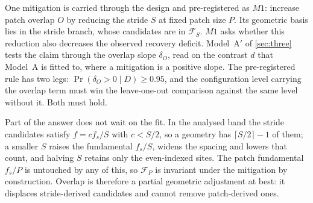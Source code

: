 One mitigation is carried through the design and pre-registered as $M1$: increase patch overlap $O$ by reducing the stride $S$ at fixed patch size $P$. Its geometric basis lies in the stride branch, whose candidates are in $\mathcal{F}_{S}$. $M1$ asks whether this reduction also decreases the observed recovery deficit. Model~A$'$ of \autoref{sec:three} tests the claim through the overlap slope $\delta_O$, read on the contrast $d$ that Model~A is fitted to, where a mitigation is a positive slope. The pre-registered rule has two legs: $\Pr(\delta_O>0\mid D)\geq0.95$, and the configuration level carrying the overlap term must win the leave-one-out comparison against the same level without it. Both must hold.

Part of the answer does not wait on the fit. In the analysed band the stride candidates satisfy $f=cf_s/S$ with $c<S/2$, so a geometry has $\lceil S/2\rceil-1$ of them; a smaller $S$ raises the fundamental $f_s/S$, widens the spacing and lowers that count, and halving $S$ retains only the even-indexed sites. The patch fundamental $f_s/P$ is untouched by any of this, so $\mathcal{F}_{P}$ is invariant under the mitigation by construction. Overlap is therefore a partial geometric adjustment at best: it displaces stride-derived candidates and cannot remove patch-derived ones.
